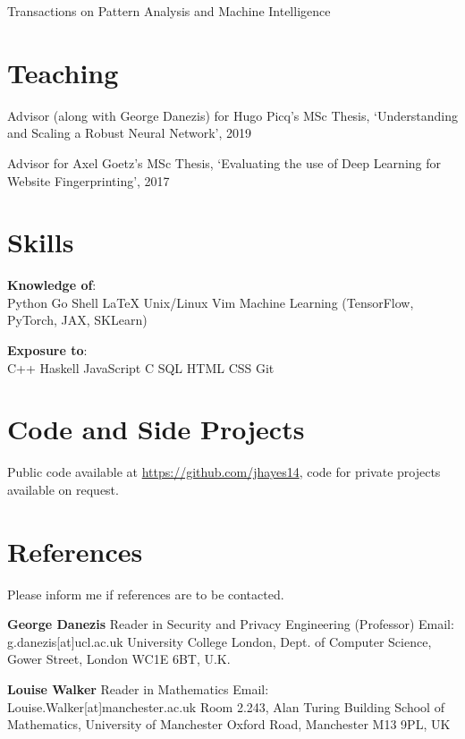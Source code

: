 \documentclass[margin,line]{res}
\begin{document}
\begin{resume}
Transactions on Pattern Analysis and Machine Intelligence

\section{\sc Teaching}

Advisor (along with George Danezis) for Hugo Picq's MSc Thesis, `Understanding and Scaling a Robust Neural Network', 2019

Advisor for Axel Goetz's MSc Thesis, `Evaluating the use of Deep Learning for Website Fingerprinting', 2017


\section{\sc Skills} 
\textbf{Knowledge of}:\\
Python \textbullet{} Go \textbullet{} Shell \textbullet{} \LaTeX \textbullet{}
Unix/Linux \textbullet{} Vim \textbullet{} Machine Learning
(TensorFlow, PyTorch, JAX, SKLearn)  

\textbf{Exposure to}:\\
C++ \textbullet{} Haskell \textbullet{} JavaScript \textbullet{} C \textbullet{} SQL \textbullet{} HTML
\textbullet{} CSS \textbullet{} Git

\section{\sc Code and Side Projects}

Public code available at \url{https://github.com/jhayes14}, code for
private projects available on request. 

\section{\sc References} 

Please inform me if references are to be contacted.

\textbf{George Danezis}\newline
Reader in Security and Privacy Engineering (Professor) \newline
Email: g.danezis[at]ucl.ac.uk \newline
University College London,\newline
Dept. of Computer Science,\newline
Gower Street, London WC1E 6BT, U.K. \newline

\textbf{Louise Walker}\newline
Reader in Mathematics \newline
Email: Louise.Walker[at]manchester.ac.uk \newline
Room 2.243, Alan Turing Building \newline
School of Mathematics,\newline
University of Manchester \newline
Oxford Road, Manchester M13 9PL, UK \newline


\end{resume}
\end{document}
